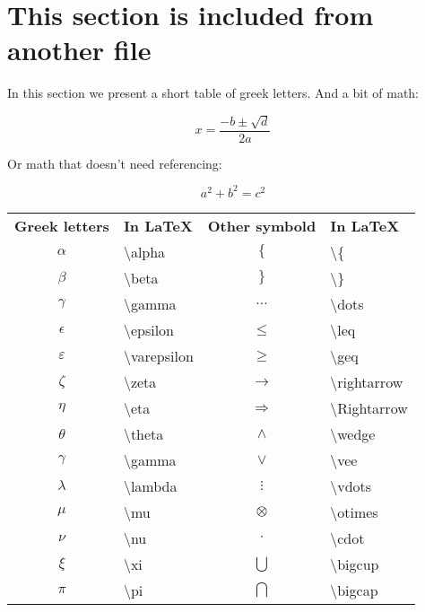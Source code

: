 \section{This section is included from another file}
\label{sec:included-section}

In this section we present a short table of greek letters. And a bit
of math:

\begin{equation}
  \label{eq:roots}
  x = \frac{-b \pm \sqrt{d}}{2a}
\end{equation}

Or math that doesn't need referencing:

$$
a^2 + b^2 = c^2
$$

\begin{table}[h]
  \centering
  \begin{tabular}{c l c l}
    \textbf{Greek letters} & \textbf{In \LaTeX} & \textbf{Other symbold} &
                                                             \textbf{In \LaTeX}\\
    $\alpha$ & \textbackslash alpha & $\{$ & \textbackslash \{ \\
    $\beta$ & \textbackslash beta & $\}$ & \textbackslash \} \\
    $\gamma$ & \textbackslash gamma & $\dots$ & \textbackslash dots \\
    $\epsilon$ & \textbackslash epsilon & $\leq$ & \textbackslash leq \\
    $\varepsilon$ & \textbackslash varepsilon & $\geq$ &
                                                         \textbackslash geq \\
    $\zeta$ & \textbackslash zeta & $\rightarrow$ & \textbackslash rightarrow \\
    $\eta$ & \textbackslash eta & $\Rightarrow$ & \textbackslash Rightarrow \\
    $\theta$ & \textbackslash theta & $\wedge$ & \textbackslash wedge \\
    $\gamma$ & \textbackslash gamma & $\vee$ & \textbackslash vee \\
    $\lambda$ & \textbackslash lambda & $\vdots$ & \textbackslash vdots \\
    $\mu$ & \textbackslash mu & $\otimes$ & \textbackslash otimes \\
    $\nu$ & \textbackslash nu & $\cdot$ & \textbackslash cdot \\
    $\xi$ & \textbackslash xi & $\bigcup$ & \textbackslash bigcup \\
    $\pi$ & \textbackslash pi & $\bigcap$ & \textbackslash bigcap \\

\end{tabular}
\end{table}
